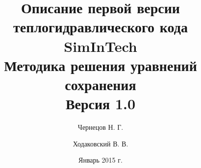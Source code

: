 \documentclass[12pt,a4paper,titlepage]{report}
\title{\textbf{Описание первой версии теплогидравлического кода SimInTech\\ Методика решения уравнений сохранения \\Версия 1.0}}
\author{Чернецов Н. Г. \and Ходаковский В. В.}
\date{Январь 2015 г.}
\begin{document}
	
\maketitle

\begin{abstract}

\end{abstract}

\setcounter{page}{3} %

\tableofcontents
\newpage














\AtEndDocument
\end{document}
